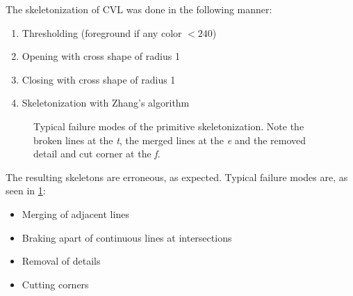 The skeletonization of CVL was done in the following manner:

\begin{enumerate}[topsep=0pt,itemsep=-1ex,partopsep=1ex,parsep=1ex]
\item Thresholding (foreground if any color $<240$)
\item Opening with cross shape of radius 1
\item Closing with cross shape of radius 1
\item Skeletonization with Zhang's algorithm~\cite{skeletonize}
\end{enumerate}


\begin{figure}
  \centering
  \hspace{0.07\textwidth}
  \caption[Typical failure modes of the primitive skeletonization]{Typical failure modes of the primitive skeletonization. Note the broken lines at the \emph{t}, the merged lines at the \emph{e} and the removed detail and cut corner at the \emph{f}.}
  \label{fig:primitiveFail}
\end{figure}


The resulting skeletons are erroneous, as expected. Typical failure modes are, as seen in \cref{fig:primitiveFail}:
\begin{itemize}[topsep=0pt,itemsep=-1ex,partopsep=1ex,parsep=1ex]
\item Merging of adjacent lines
\item Braking apart of continuous lines at intersections
\item Removal of details
\item Cutting corners
\end{itemize}


